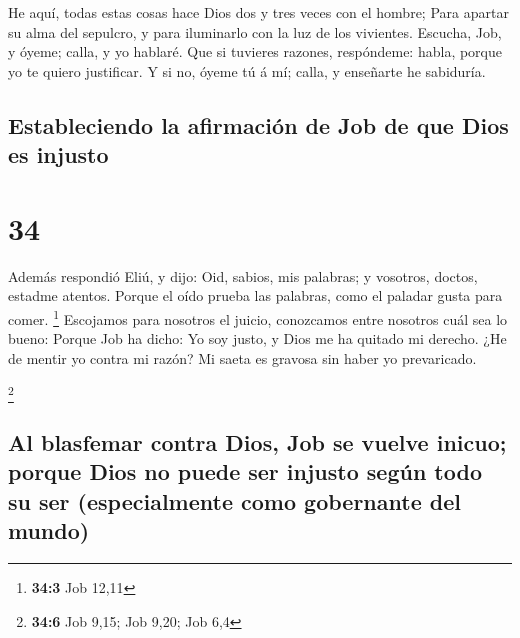  He aquí, todas estas cosas hace Dios dos y tres veces con
el hombre;  Para apartar su alma del sepulcro, y para
iluminarlo con la luz de los vivientes.  Escucha, Job, y
óyeme; calla, y yo hablaré.  Que si tuvieres razones,
respóndeme: habla, porque yo te quiero justificar.  Y si
no, óyeme tú á mí; calla, y enseñarte he sabiduría.

\hypertarget{estableciendo-la-afirmaciuxf3n-de-job-de-que-dios-es-injusto}{%
\subsection{Estableciendo la afirmación de Job de que Dios es
injusto}\label{estableciendo-la-afirmaciuxf3n-de-job-de-que-dios-es-injusto}}

\hypertarget{section-33}{%
\section{34}\label{section-33}}

 Además respondió Eliú, y dijo:  Oid, sabios,
mis palabras; y vosotros, doctos, estadme atentos.  Porque
el oído prueba las palabras, como el paladar gusta para comer.
\footnote{\textbf{34:3} Job 12,11}  Escojamos para nosotros
el juicio, conozcamos entre nosotros cuál sea lo bueno: 
Porque Job ha dicho: Yo soy justo, y Dios me ha quitado mi derecho.
 ¿He de mentir yo contra mi razón? Mi saeta es gravosa sin
haber yo prevaricado.

\footnote{\textbf{34:6} Job 9,15; Job 9,20; Job 6,4}

\hypertarget{al-blasfemar-contra-dios-job-se-vuelve-inicuo-porque-dios-no-puede-ser-injusto-seguxfan-todo-su-ser-especialmente-como-gobernante-del-mundo}{%
\subsection{Al blasfemar contra Dios, Job se vuelve inicuo; porque Dios
no puede ser injusto según todo su ser (especialmente como gobernante
del
mundo)}\label{al-blasfemar-contra-dios-job-se-vuelve-inicuo-porque-dios-no-puede-ser-injusto-seguxfan-todo-su-ser-especialmente-como-gobernante-del-mundo}}


